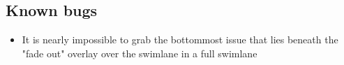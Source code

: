 \subsection{Known bugs}

\begin{itemize}
  \item It is nearly impossible to grab the bottommost issue that lies beneath the "fade out" overlay over the swimlane in a full swimlane
\end{itemize}
